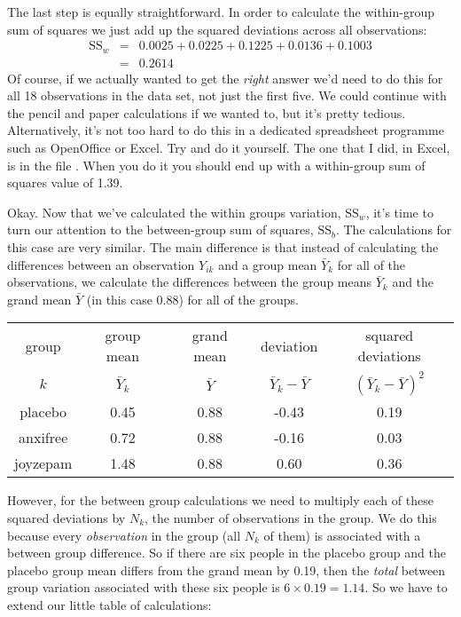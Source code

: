 \noindent
The last step is equally straightforward. In order to calculate the within-group sum of squares we just add up the squared deviations across all observations:
$$
\begin{array}{rcl}
\mbox{SS}_w &=& 0.0025 + 0.0225 + 0.1225 + 0.0136 + 0.1003 \\
&=& 0.2614
\end{array}
$$
\noindent
Of course, if we actually wanted to get the {\it right} answer we'd need to do this for all 18 observations in the data set, not just the first five. We could continue with the pencil and paper calculations if we wanted to, but it's pretty tedious. Alternatively, it's not too hard to do this in a dedicated spreadsheet programme such as OpenOffice or Excel. Try and do it yourself. The one that I did, in Excel, is in the file . When you do it you should end up with a within-group sum of squares value of 1.39. 

Okay. Now that we've calculated the within groups variation, $\mbox{SS}_w$, it's time to turn our attention to the between-group sum of squares, $\mbox{SS}_b$. The calculations for this case are very similar. The main difference is that instead of calculating the differences between an observation $Y_{ik}$ and a group mean $\bar{Y}_k$ for all of the observations, we calculate the differences between the group means $\bar{Y}_k$ and the grand mean $\bar{Y}$ (in this case 0.88) for all of the groups. 

\small
\vspace*{6pt}
\begin{tabular}{c|c|c|c|c}
 group & group mean  & grand mean & deviation               & squared deviations \\  
  $k$  & $\bar{Y}_k$ & $\bar{Y}$  & $\bar{Y}_{k} - \bar{Y}$ & $(\bar{Y}_{k} - \bar{Y})^2$ \\  \hline
placebo   & 0.45  &  0.88 &  -0.43 &  0.19 \\
anxifree  & 0.72  &  0.88 &  -0.16 &  0.03 \\
joyzepam  & 1.48  &  0.88 &  0.60  &  0.36 \\
\end{tabular}
\vspace*{6pt}
\normalsize

\noindent
However, for the between group calculations we need to multiply each of these squared deviations by $N_k$, the number of observations in the group. We do this because every {\it observation} in the group (all $N_k$ of them) is associated with a between group difference. So if there are six people in the placebo group and the placebo group mean differs from the grand mean by 0.19, then the {\it total} between group variation associated with these six people is $6 \times 0.19 = 1.14$. So we have to extend our little table of calculations:

